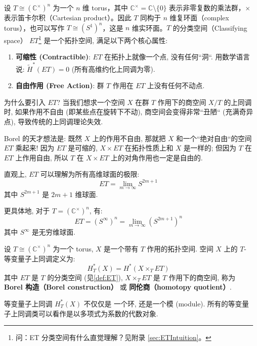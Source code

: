 \begin{Definition}
\label{def:ET}
设 $T \cong (\mathbb{C}^\times)^n$ 为一个 $n$ 维 torus，其中 $\mathbb{C}^\times = \mathbb{C} \setminus \{0\}$ 表示非零复数的乘法群，$\times$ 表示笛卡尔积（Cartesian product）。因此 $T$ 同构于 $n$ 维复环面（complex torus），也可以写作 $T \cong (S^1)^n$，这是 $n$ 维实环面。$T$ 的分类空间（Classifying space） $ET$\footnote{问：ET 分类空间有什么直觉理解？见附录 \cref{sec:ETIntuition}。} 是一个拓扑空间, 满足以下两个核心属性:
\begin{enumerate}
\item \textbf{可缩性 (Contractible)}: $ET$ 在拓扑上就像一个点, 没有任何``洞``. 用数学语言说: $\widetilde{H}^*(ET) = 0$ (所有高维约化上同调为零).
\item \textbf{自由作用 (Free Action)}: 群 $T$ 作用在 $ET$ 上没有任何不动点.
\end{enumerate}

为什么要引入 $ET$? 当我们想求一个空间 $X$ 在群 $T$ 作用下的商空间 $X/T$ 的上同调时, 如果作用不自由 (即某些点在旋转下不动), 商空间会变得非常``丑陋`` (充满奇异点), 导致传统的上同调理论失效.

 Borel 的天才想法是: 既然 $X$ 上的作用不自由, 那就把 $X$ 和一个``绝对自由``的空间 $ET$ 乘起来! 因为 $ET$ 是可缩的, $X \times ET$ 在拓扑性质上和 $X$ 是一样的; 但因为 $T$ 在 $ET$ 上作用自由, 所以 $T$ 在 $X \times ET$ 上的对角作用也一定是自由的.

直观上, $ET$ 可以理解为所有高维球面的极限:
$$ET = \lim_{m \to \infty} S^{2m+1}$$
其中 $S^{2m+1}$ 是 $2m+1$ 维球面.

更具体地, 对于 $T = (\mathbb{C}^\times)^n$, 有:
$$ET = (S^\infty)^n = \lim_{m \to \infty} (S^{2m+1})^n$$
其中 $S^\infty$ 是无穷维球面.
\end{Definition}

\begin{Definition}
\label{def:EquivariantCohomology}
设 $T \cong (\mathbb{C}^\times)^n$ 为一个 torus, $X$ 是一个带有 $T$ 作用的拓扑空间. 空间 $X$ 上的 $T$-等变量子上同调定义为:
\begin{equation}
H_T^*(X) = H^*(X \times_T ET)
\end{equation}
其中 $ET$ 是 $T$ 的分类空间 (见\cref{def:ET}), $X \times_T ET$ 是 $T$ 作用下的商空间, 称为 \textbf{Borel 构造（Borel construction）} 或 \textbf{同伦商（homotopy quotient）}.

等变量子上同调 $H_T^*(X)$ 不仅仅是 一个环, 还是一个模 (module). 所有的等变量子上同调类可以看作是以多项式为系数的代数对象.
\end{Definition}

